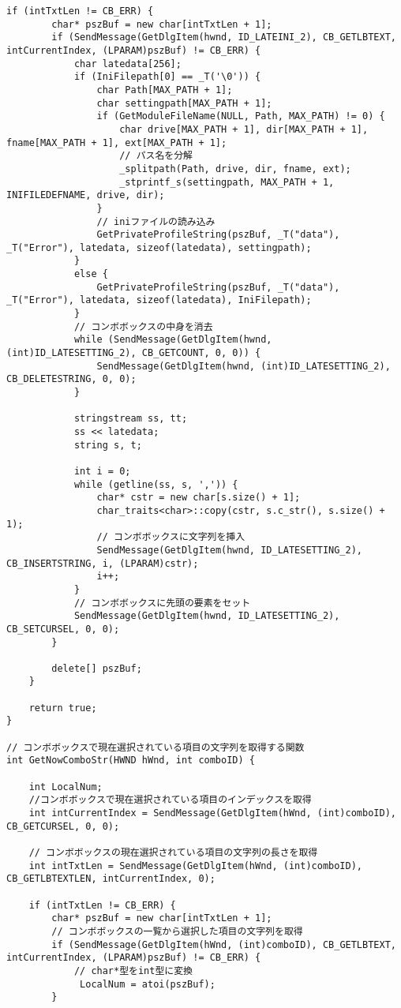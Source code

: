 \begin{lstlisting}[caption=main.cpp]
	if (intTxtLen != CB_ERR) {
		char* pszBuf = new char[intTxtLen + 1];
		if (SendMessage(GetDlgItem(hwnd, ID_LATEINI_2), CB_GETLBTEXT, intCurrentIndex, (LPARAM)pszBuf) != CB_ERR) {
			char latedata[256];
			if (IniFilepath[0] == _T('\0')) {
				char Path[MAX_PATH + 1];
				char settingpath[MAX_PATH + 1];
				if (GetModuleFileName(NULL, Path, MAX_PATH) != 0) {
					char drive[MAX_PATH + 1], dir[MAX_PATH + 1], fname[MAX_PATH + 1], ext[MAX_PATH + 1];
					// パス名を分解
					_splitpath(Path, drive, dir, fname, ext);
					_stprintf_s(settingpath, MAX_PATH + 1, INIFILEDEFNAME, drive, dir);
				}
				// iniファイルの読み込み
				GetPrivateProfileString(pszBuf, _T("data"), _T("Error"), latedata, sizeof(latedata), settingpath);
			}
			else {
				GetPrivateProfileString(pszBuf, _T("data"), _T("Error"), latedata, sizeof(latedata), IniFilepath);
			}
			// コンボボックスの中身を消去
			while (SendMessage(GetDlgItem(hwnd, (int)ID_LATESETTING_2), CB_GETCOUNT, 0, 0)) {
				SendMessage(GetDlgItem(hwnd, (int)ID_LATESETTING_2), CB_DELETESTRING, 0, 0);
			}

			stringstream ss, tt;
			ss << latedata;
			string s, t;

			int i = 0;
			while (getline(ss, s, ',')) {
				char* cstr = new char[s.size() + 1];
				char_traits<char>::copy(cstr, s.c_str(), s.size() + 1);
				// コンボボックスに文字列を挿入
				SendMessage(GetDlgItem(hwnd, ID_LATESETTING_2), CB_INSERTSTRING, i, (LPARAM)cstr);
				i++;
			}
			// コンボボックスに先頭の要素をセット
			SendMessage(GetDlgItem(hwnd, ID_LATESETTING_2), CB_SETCURSEL, 0, 0);
		}

		delete[] pszBuf;
	}

	return true;
}

// コンボボックスで現在選択されている項目の文字列を取得する関数
int GetNowComboStr(HWND hWnd, int comboID) {

	int LocalNum;
	//コンボボックスで現在選択されている項目のインデックスを取得
	int intCurrentIndex = SendMessage(GetDlgItem(hWnd, (int)comboID), CB_GETCURSEL, 0, 0);

	// コンボボックスの現在選択されている項目の文字列の長さを取得
	int intTxtLen = SendMessage(GetDlgItem(hWnd, (int)comboID), CB_GETLBTEXTLEN, intCurrentIndex, 0);

	if (intTxtLen != CB_ERR) {
		char* pszBuf = new char[intTxtLen + 1];
		// コンボボックスの一覧から選択した項目の文字列を取得
		if (SendMessage(GetDlgItem(hWnd, (int)comboID), CB_GETLBTEXT, intCurrentIndex, (LPARAM)pszBuf) != CB_ERR) {
			// char*型をint型に変換
			 LocalNum = atoi(pszBuf);
		}


\end{lstlisting}
